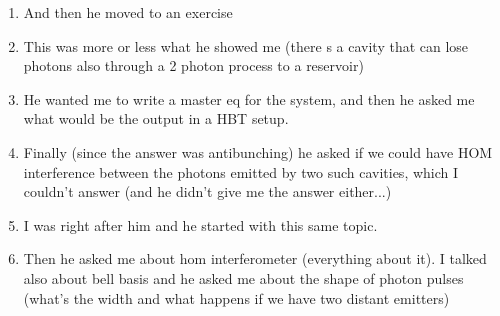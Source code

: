\documentclass{article}%
\begin{document}
\begin{enumerate}
\item%
And then he moved to an exercise%
\item%
This was more or less what he showed me (there s a cavity that can lose photons also through a 2 photon process to a reservoir)%
\item%
He wanted me to write a master eq for the system, and then he asked me what would be the output in a HBT setup.%
\item%
Finally (since the answer was antibunching) he asked if we could have HOM interference between the photons emitted by two such cavities, which I couldn't answer (and he didn't give me the answer either...)%
\item%
I was right after him and he started with this same topic.%
\item%
Then he asked me about hom interferometer (everything about it). I talked also about bell basis and he asked me about the shape of photon pulses (what’s the width and what happens if we have two distant emitters)%
\end{enumerate}%
\end{document}
